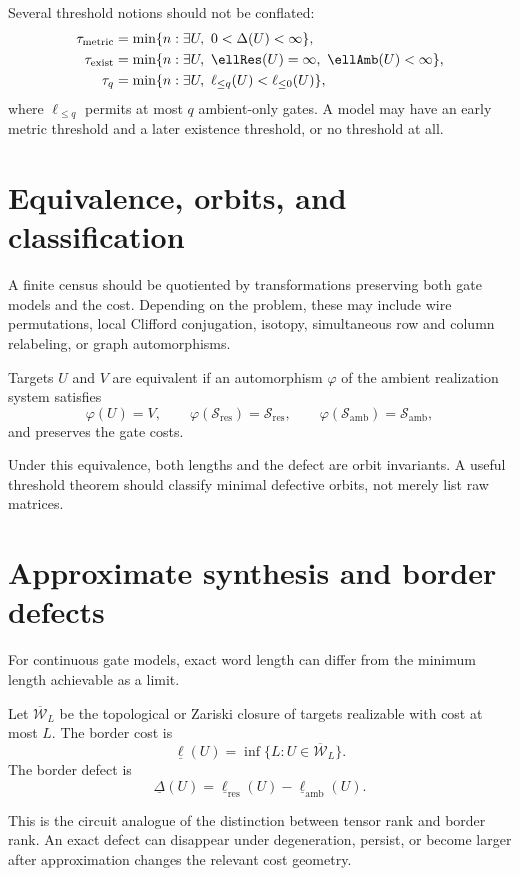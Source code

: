 Several threshold notions should not be conflated:
\begin{align*}
\tau_{\mathrm{metric}}&=\min\{n:\exists U,\ 0<\Delta(U)<\infty\},\\
\tau_{\mathrm{exist}}&=\min\{n:\exists U,\ \ellRes(U)=\infty,\ \ellAmb(U)<\infty\},\\
\tau_{q}&=\min\{n:\exists U,\ \ell_{\le q}(U)<\ell_{\le0}(U)\},
\end{align*}
where $\ell_{\le q}$ permits at most $q$ ambient-only gates.  A model may have an early metric threshold and a later existence threshold, or no threshold at all.

\section{Equivalence, orbits, and classification}
A finite census should be quotiented by transformations preserving both gate models and the cost.  Depending on the problem, these may include wire permutations, local Clifford conjugation, isotopy, simultaneous row and column relabeling, or graph automorphisms.

\begin{definition}
Targets $U$ and $V$ are equivalent if an automorphism $\varphi$ of the ambient realization system satisfies
\[
\varphi(U)=V,
\qquad
\varphi(\mathcal S_{\mathrm{res}})=\mathcal S_{\mathrm{res}},
\qquad
\varphi(\mathcal S_{\mathrm{amb}})=\mathcal S_{\mathrm{amb}},
\]
and preserves the gate costs.
\end{definition}
Under this equivalence, both lengths and the defect are orbit invariants.  A useful threshold theorem should classify minimal defective orbits, not merely list raw matrices.

\section{Approximate synthesis and border defects}
For continuous gate models, exact word length can differ from the minimum length achievable as a limit.
\begin{definition}
Let $\overline{\mathcal W}_{L}$ be the topological or Zariski closure of targets realizable with cost at most $L$.  The border cost is
\[
\underline\ell(U)=\inf\{L:U\in\overline{\mathcal W}_{L}\}.
\]
The border defect is
\[
\underline\Delta(U)=
\underline\ell_{\mathrm{res}}(U)-
\underline\ell_{\mathrm{amb}}(U).
\]
\end{definition}
This is the circuit analogue of the distinction between tensor rank and border rank.  An exact defect can disappear under degeneration, persist, or become larger after approximation changes the relevant cost geometry.

